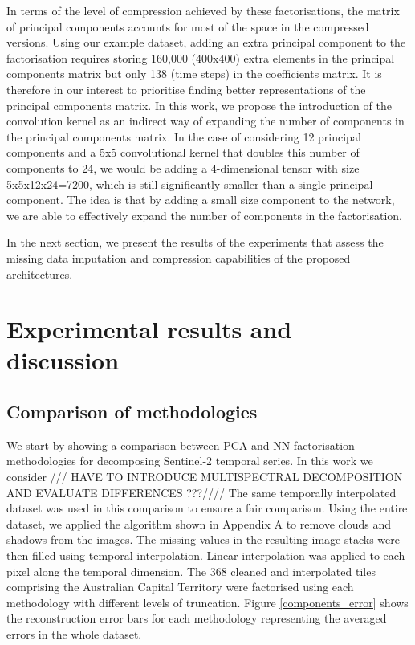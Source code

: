\documentclass[essd, manuscript]{copernicus}
\begin{document}
In terms of the level of compression achieved by these factorisations, the matrix of principal components accounts for most of the space in the compressed versions. Using our example dataset, adding an extra principal component to the factorisation requires storing 160,000 (400x400) extra elements in the principal components matrix but only 138 (time steps) in the coefficients matrix. It is therefore in our interest to prioritise finding better representations of the principal components matrix. In this work, we propose the introduction of the convolution kernel as an indirect way of expanding the number of components in the principal components matrix. In the case of considering 12 principal components and a 5x5 convolutional kernel that doubles this number of components to 24, we would be adding a 4-dimensional tensor with size 5x5x12x24=7200, which is still significantly smaller than a single principal component. The idea is that by adding a small size component to the network, we are able to effectively expand the number of components in the factorisation.

In the next section, we present the results of the experiments that assess the missing data imputation and compression capabilities of the proposed architectures. 


\section{Experimental results and discussion}

\subsection{Comparison of methodologies}
We start by showing a comparison between PCA and NN factorisation methodologies for decomposing Sentinel-2 temporal series. In this work we consider /// HAVE TO INTRODUCE MULTISPECTRAL DECOMPOSITION AND EVALUATE DIFFERENCES ???//// The same temporally interpolated dataset was used in this comparison to ensure a fair comparison. Using the entire dataset, we applied the algorithm shown in Appendix A to remove clouds and shadows from the images. The missing values in the resulting image stacks were then filled using temporal interpolation. Linear interpolation was applied to each pixel along the temporal dimension. The 368 cleaned and interpolated tiles comprising the Australian Capital Territory were factorised using each methodology with different levels of truncation. Figure \ref{components_error} shows the reconstruction error bars for each methodology representing the averaged errors in the whole dataset. 
\end{document}
